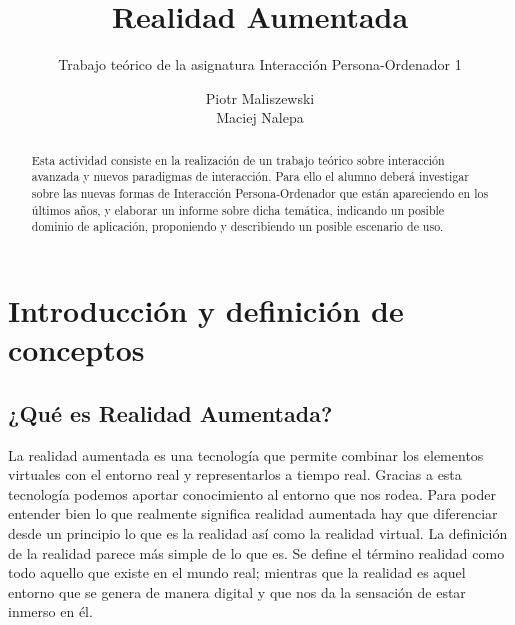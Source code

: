\documentclass[a4paper,11pt]{scrartcl}
\title{Realidad Aumentada}
\subtitle{Trabajo teórico de la asignatura Interacción Persona-Ordenador 1}
\author{Piotr Maliszewski\\Maciej Nalepa}
\begin{document}
\maketitle

\begin{abstract}

Esta actividad consiste en la realización de un trabajo teórico sobre interacción avanzada y
nuevos paradigmas de interacción. Para ello el alumno deberá investigar sobre las nuevas
formas de Interacción Persona-Ordenador que están apareciendo en los últimos años, y elaborar un
informe sobre dicha temática, indicando un posible dominio de aplicación, proponiendo y
describiendo un posible escenario de uso.

\end{abstract}

\section{Introducción y definición de conceptos}
\subsection{¿Qué es Realidad Aumentada?}
La realidad aumentada es una tecnología que permite combinar los elementos virtuales con el entorno real y representarlos a tiempo real. Gracias a esta tecnología podemos aportar conocimiento al entorno que nos rodea. Para poder entender bien lo que realmente significa realidad aumentada hay que diferenciar desde un principio lo que es la realidad así como la realidad virtual. La definición de la realidad parece más simple de lo que es. Se define el término realidad como todo aquello que existe en el mundo real; mientras que la realidad es aquel entorno que se genera de manera digital y que nos da la sensación de estar inmerso en él.
\end{document}
